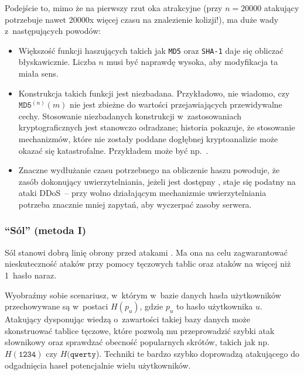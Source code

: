 Podejście to, mimo że na pierwszy rzut oka atrakcyjne (przy $n = 20000$
atakujący potrzebuje nawet 20000x więcej czasu na znalezienie kolizji!), ma
duże wady z~następujących powodów:

\begin{itemize}

\item Większość funkcji haszujących takich jak \texttt{MD5} oraz \texttt{SHA-1}
daje się obliczać błyskawicznie. Liczba $n$ musi być naprawdę wysoka, aby
modyfikacja ta miała sens.

\item Konstrukcja takich funkcji jest niezbadana. Przykładowo, nie wiadomo, czy
$\mathtt{MD5}^{(n)}(m)$ nie jest zbieżne do wartości przejawiających przewidywalne
cechy. Stosowanie niezbadanych konstrukcji w~zastosowaniach kryptograficznych
jest stanowczo odradzane; historia pokazuje, że stosowanie mechanizmów, które
nie zostały poddane dogłębnej kryptoanalizie może okazać się katastrofalne.
Przykładem może być np.~\cite{untested_cryptography}.

\item Znaczne wydłużanie czasu potrzebnego na obliczenie haszu powoduje, że
zasób dokonujący uwierzytelniania, jeżeli jest dostępny , staje się
podatny na ataki DDoS~-- przy wolno działającym mechanizmie uwierzytelniania
potrzeba znacznie mniej zapytań, aby wyczerpać zasoby serwera.

\end{itemize}

\label{salt_1}
\subsubsection{``Sól'' (metoda I)}

Sól stanowi dobrą linię obrony przed atakami . Ma ona na celu
zagwarantować nieskuteczność ataków przy pomocy tęczowych tablic oraz ataków na
więcej niż 1~hasło naraz.

Wyobraźmy sobie scenariusz, w~którym w~bazie danych hasła użytkowników
przechowywane są w~postaci $H(p_u)$, gdzie $p_u$ to hasło użytkownika $u$.
Atakujący dysponując wiedzą o~zawartości takiej bazy danych może skonstruować
tablice tęczowe, które pozwolą mu przeprowadzić szybki atak słownikowy oraz
sprawdzać obecność popularnych skrótów, takich jak np. $H(\texttt{1234})$ czy
$H(\texttt{qwerty}$). Techniki te bardzo szybko doprowadzą atakującego do
odgadnięcia haseł potencjalnie wielu użytkowników.

